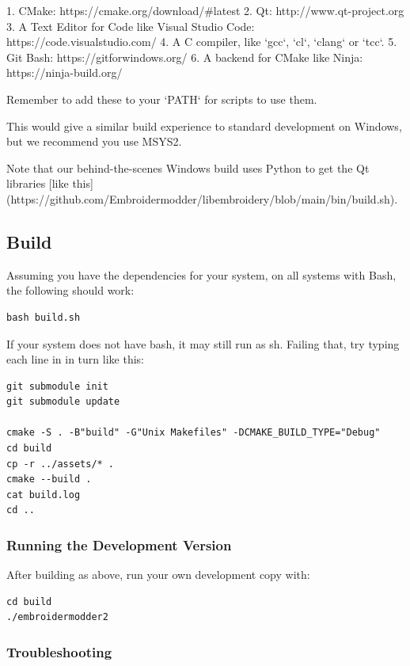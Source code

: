 1. CMake: https://cmake.org/download/#latest
2. Qt: http://www.qt-project.org
3. A Text Editor for Code like Visual Studio Code: https://code.visualstudio.com/
4. A C compiler, like `gcc`, `cl`, `clang` or `tcc`.
5. Git Bash: https://gitforwindows.org/
6. A backend for CMake like Ninja: https://ninja-build.org/

Remember to add these to your `PATH` for scripts to use them.

This would give a similar build experience to standard development on Windows, but we recommend you use MSYS2.

Note that our behind-the-scenes Windows build uses Python to get the Qt libraries
[like this](https://github.com/Embroidermodder/libembroidery/blob/main/bin/build.sh).

\subsection{Build}

Assuming you have the dependencies for your system, on all systems with Bash, the following should work:

\begin{lstlisting}
bash build.sh
\end{lstlisting}

If your system does not have bash, it may still run as sh.
Failing that, try typing each line in in turn like this:

\begin{lstlisting}
git submodule init
git submodule update

cmake -S . -B"build" -G"Unix Makefiles" -DCMAKE_BUILD_TYPE="Debug"
cd build
cp -r ../assets/* .
cmake --build .
cat build.log
cd ..
\end{lstlisting}

\subsubsection{Running the Development Version}

After building as above, run your own development copy with:

\begin{lstlisting}
cd build
./embroidermodder2
\end{lstlisting}

\subsubsection{Troubleshooting}

